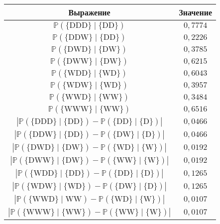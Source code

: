 \begin{multicols}{2}
\begin{table*}[b]
\begin{center}
\tabcolsep=16pt
\begin{tabular}{|c|c|}
\hline
{Выражение}&{Значение}\\
\hline
$\mathbb{P}(\{\mathrm{DDD}\}\mid \{\mathrm{DD}\})$&$0{,}7774$\\
$\mathbb{P}(\{\mathrm{DDW}\}\mid \{\mathrm{DD}\})$&$0{,}2226$\\
$\mathbb{P}(\{\mathrm{DWD}\}\mid \{\mathrm{DW}\})$&$0{,}3785$\\
$\mathbb{P}(\{\mathrm{DWW}\}\mid \{\mathrm{DW}\})$&$0{,}6215$\\
$\mathbb{P}(\{\mathrm{WDD}\}\mid \{\mathrm{WD}\})$&$0{,}6043$\\
$\mathbb{P}(\{\mathrm{WDW}\}\mid \{\mathrm{WD}\})$&$0{,}3957$\\
$\mathbb{P}(\{\mathrm{WWD}\}\mid \{\mathrm{WW}\})$&$0{,}3484$\\
$\mathbb{P}(\{\mathrm{WWW}\}\mid \{\mathrm{WW}\})$&$0{,}6516$\\
$\left|\mathbb{P}(\{\mathrm{DDD}\}\mid \{\mathrm{DD}\})-\mathbb{P}(\{\mathrm{DD}\}\mid \{\mathrm{D}\})\right|$&$0{,}0466$\\
$\left|\mathbb{P}(\{\mathrm{DDW}\}\mid \{\mathrm{DD}\})-\mathbb{P}(\{\mathrm{DW}\}\mid \{\mathrm{D}\})\right|$&$0{,}0466$\\
$\left|\mathbb{P}(\{\mathrm{DWD}\}\mid \{\mathrm{DW}\})-\mathbb{P}(\{\mathrm{WD}\}\mid \{\mathrm{W}\})\right|$&$0{,}0192$\\
$\left|\mathbb{P}(\{\mathrm{DWW}\}\mid \{\mathrm{DW}\})-\mathbb{P}(\{\mathrm{WW}\}
\mid \{\mathrm{W}\})\right|$&$0{,}0192$\\
$\left|\mathbb{P}(\{\mathrm{WDD}\}\mid \{\mathrm{DD}\})-\mathbb{P}(\{\mathrm{DD}\}\mid \{\mathrm{D}\})\right|$&$0{,}1265$\\
$\left|\mathbb{P}(\{\mathrm{WDW}\}\mid \{\mathrm{WD}\})-\mathbb{P}(\{\mathrm{DW}\}\mid \{\mathrm{D}\})\right|$&$0{,}1265$\\
$\left|\mathbb{P}(\{\mathrm{WWD}\}\mid \mathrm{WW})-\mathbb{P}(\{\mathrm{WD}\}\mid \{\mathrm{W}\})\right|$&$0{,}0107$\\
$\left|\mathbb{P}(\{\mathrm{WWW}\}\mid \{\mathrm{WW}\})-\mathbb{P}(\{\mathrm{WW}\}\mid \{\mathrm{W}\})\right|$&$0{,}0107$\\
\hline
\end{tabular}
\end{center}
\end{table*}


\end{multicols}
